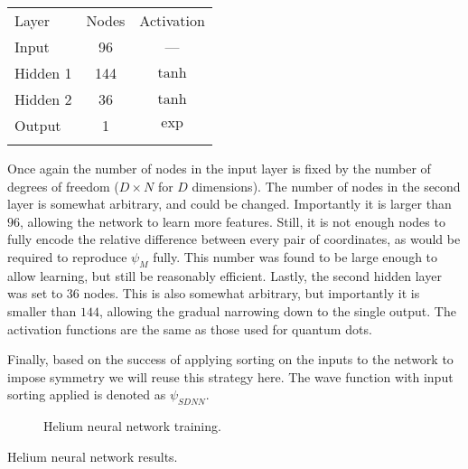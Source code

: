 \documentclass[Thesis.tex]{subfiles}
\begin{document}
\begin{center}
  \begin{tabular}{lcc}
    \toprule
    \addlinespace
    Layer & Nodes & Activation\\
    \addlinespace
    \midrule
    \addlinespace
    \addlinespace
    Input & 96 & ---\\
    Hidden 1& 144 & $\tanh$\\
    Hidden 2& 36 & $\tanh$\\
    Output & 1 & $\exp$\\
    \addlinespace
    \addlinespace
    \bottomrule
  \end{tabular}
\end{center}
Once again the number of nodes in the input layer is fixed by the number of
degrees of freedom ($D\times N$ for $D$ dimensions). The number of nodes in the
second layer is somewhat arbitrary, and could be changed. Importantly it is
larger than $96$, allowing the network to learn more features. Still, it is not
enough nodes to fully encode the relative difference between every pair of
coordinates, as would be required to reproduce $\psi_M$ fully. This number was
found to be large enough to allow learning, but still be reasonably efficient.
Lastly, the second hidden layer was set to $36$ nodes. This is also somewhat
arbitrary, but importantly it is smaller than $144$, allowing the gradual
narrowing down to the single output. The activation functions are the same as
those used for quantum dots.

Finally, based on the success of applying sorting on the inputs to the network
to impose symmetry we will reuse this strategy here. The wave function with
input sorting applied is denoted as $\psi_{SDNN}$.

\begin{figure}[h]
  \centering
  
  \caption{\label{fig:He-dnn-training}Helium neural network training.}
\end{figure}

\begin{table}[h]
  \centering
  
  \caption{\label{tab:He-dnn-results}Helium neural network results.}
\end{table}
\end{document}
